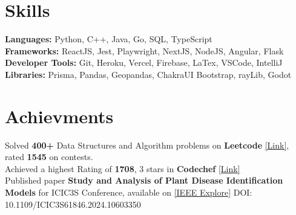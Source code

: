 \documentclass[]{Nikhil_Kadiyan_Resume}
\begin{document}

\section{Skills} 
\hrulefill

\pt \textbf{Languages:} Python, C++, Java, Go, SQL, TypeScript \\
\pt \textbf{Frameworks:} ReactJS, Jest, Playwright, NextJS, NodeJS, Angular, Flask\\
\pt \textbf{Developer Tools:}  Git, Heroku, Vercel, Firebase, LaTex, VSCode, IntelliJ\\
\pt \textbf{Libraries:} Prisma, Pandas, Geopandas, ChakraUI Bootstrap, rayLib, Godot\\

\sectionsep

\section{Achievments} 
\hrulefill

\pt Solved \textbf{400+} Data Structures and Algorithm problems on \textbf{Leetcode} \href{https://leetcode.com/anidnottaken/}{[Link]}, rated \textbf{1545} on contests.\\ 
\pt Achieved a highest Rating of \textbf{1708}, 3 stars in \textbf{Codechef} \href{https://www.codechef.com/users/nikhilcad}{[Link]} \\
\pt Published paper \textbf{Study and Analysis of Plant Disease Identification Models} for ICIC3S Conference, available on \href{https://ieeexplore.ieee.org/document/10603350}{[IEEE Explore]} DOI: 10.1109/ICIC3S61846.2024.10603350\\
\end{document}
